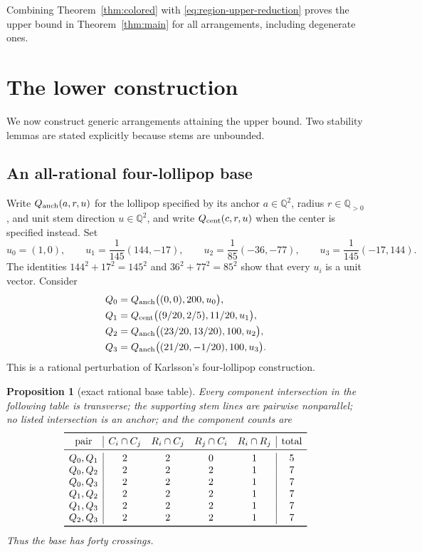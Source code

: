 \documentclass[11pt]{article}
\theoremstyle{plain}
\newtheorem{proposition}[theorem]{Proposition}
\theoremstyle{definition}
\theoremstyle{remark}
\newcommand{\Q}{\mathbb Q}
\newcommand{\1}{\mathbf 1}
\begin{document}
Combining Theorem~\ref{thm:colored} with
\eqref{eq:region-upper-reduction} proves the upper bound in
Theorem~\ref{thm:main} for all arrangements, including degenerate ones.

\section{The lower construction}\label{sec:lower}

We now construct generic arrangements attaining the upper bound.  Two
stability lemmas are stated explicitly because stems are unbounded.

\subsection{An all-rational four-lollipop base}

Write $Q_{\rm anch}(a,r,u)$ for the lollipop specified by its anchor
$a\in\Q^2$, radius $r\in\Q_{>0}$, and unit stem direction $u\in\Q^2$, and
write $Q_{\rm cent}(c,r,u)$ when the center is specified instead.  Set
\[
 u_0=(1,0),\qquad
 u_1=\frac1{145}(144,-17),\qquad
 u_2=\frac1{85}(-36,-77),\qquad
 u_3=\frac1{145}(-17,144).
\]
The identities $144^2+17^2=145^2$ and $36^2+77^2=85^2$ show that every
$u_i$ is a unit vector.  Consider
\begin{align*}
 Q_0&=Q_{\rm anch}\bigl((0,0),200,u_0\bigr),\\
 Q_1&=Q_{\rm cent}\bigl((9/20,2/5),11/20,u_1\bigr),\\
 Q_2&=Q_{\rm anch}\bigl((23/20,13/20),100,u_2\bigr),\\
 Q_3&=Q_{\rm anch}\bigl((21/20,-1/20),100,u_3\bigr).
\end{align*}
This is a rational perturbation of Karlsson's four-lollipop construction.

\begin{proposition}[exact rational base table]\label{prop:base}
Every component intersection in the following table is transverse; the
supporting stem lines are pairwise nonparallel; no listed intersection is an
anchor; and the component counts are
\[
\begin{array}{c|cccc|c}
\toprule
\text{pair}&C_i\cap C_j&R_i\cap C_j&R_j\cap C_i&R_i\cap R_j&\text{total}\\
\midrule
Q_0,Q_1&2&2&0&1&5\\
Q_0,Q_2&2&2&2&1&7\\
Q_0,Q_3&2&2&2&1&7\\
Q_1,Q_2&2&2&2&1&7\\
Q_1,Q_3&2&2&2&1&7\\
Q_2,Q_3&2&2&2&1&7\\
\bottomrule
\end{array}
\]
Thus the base has forty crossings.
\end{proposition}
\end{document}
